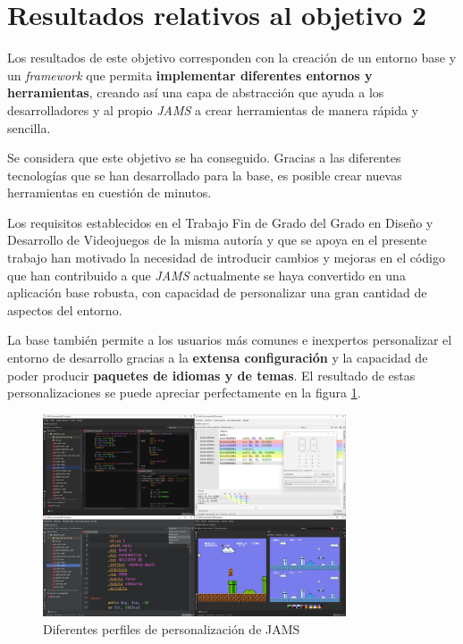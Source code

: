 \section{Resultados relativos al objetivo 2}\label{sec:resultados-relativos-al-objetivo-2}

Los resultados de este objetivo corresponden con la creación de
un entorno base y un \textit{framework} que permita \textbf{implementar
diferentes entornos y herramientas}, creando así una capa
de abstracción que ayuda a los desarrolladores y al propio
\textit{JAMS} a crear herramientas de manera rápida y sencilla.

Se considera que este objetivo se ha conseguido.
Gracias a las diferentes tecnologías que se han desarrollado
para la base, es posible crear nuevas herramientas en cuestión
de minutos.

Los requisitos establecidos en el Trabajo Fin de Grado del Grado en Diseño
y Desarrollo de Videojuegos de la misma autoría y que se apoya en el presente
trabajo han motivado la necesidad de introducir cambios y mejoras en el código
que han contribuido a que \textit{JAMS} actualmente se haya convertido en una
aplicación base robusta, con capacidad de personalizar
una gran cantidad de aspectos del entorno.

La base también permite a los usuarios más comunes e
inexpertos personalizar el entorno de desarrollo gracias a la
\textbf{extensa configuración} y la capacidad de poder producir
\textbf{paquetes de idiomas y de temas}.
El resultado de estas personalizaciones se puede apreciar
perfectamente en la figura \ref{fig:jams-collage}.

\begin{figure}[h]
    \centering
    \includegraphics[width=0.8\textwidth]{images/result/jams-collage}
    \caption{Diferentes perfiles de personalización de JAMS}
    \label{fig:jams-collage}
\end{figure}

